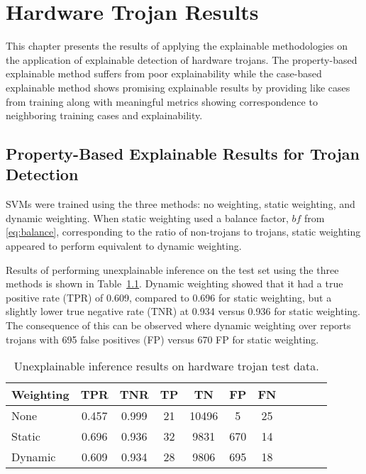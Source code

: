 \chapter{Hardware Trojan Results} \label{ch:trojan_results}

This chapter presents the results of applying the explainable methodologies on
the application of explainable detection of hardware trojans.  The
property-based explainable method suffers from poor explainability while the
case-based explainable method shows promising explainable results by providing
like cases from training along with meaningful metrics showing correspondence to
neighboring training cases and explainability.


\section{Property-Based Explainable Results for Trojan Detection} \label{prop_exp_results_trojan}

SVMs were trained using the three methods: no weighting, static weighting, and
dynamic weighting.  When static weighting used a balance factor, $bf$ from
\ref{eq:balance}, corresponding to the ratio of non-trojans to trojans, static
weighting appeared to perform equivalent to dynamic weighting.

Results of performing unexplainable inference on the test set using the three
methods is shown in Table~\ref{tab_unexp_weight_comp}. Dynamic weighting showed
that it had a true positive rate (TPR) of 0.609, compared to 0.696 for static
weighting, but a slightly lower true negative rate (TNR) at 0.934 versus 0.936
for static weighting. The consequence of this can be observed where dynamic
weighting over reports trojans with 695 false positives (FP) versus 670 FP for
static weighting.

\begin{table}[H]
    \renewcommand{\arraystretch}{1.3}
    \caption{Unexplainable inference results on hardware trojan test data.}
    \begin{center}
    \begin{tabular}{|l|c|c|c|c|c|c|c|c|c|c|}
        \hline
         Weighting &  TPR &  TNR &  TP &  TN &  FP &  FN \\
        \hline
        \hline
        None & 0.457 & 0.999 & 21 & 10496 & 5 & 25 \\
        \hline
        Static & 0.696 & 0.936 & 32 & 9831 & 670 & 14 \\
        \hline
        Dynamic & 0.609 & 0.934 & 28 & 9806 & 695 & 18 \\
        \hline
    \end{tabular}
    \end{center}
    \label{tab_unexp_weight_comp}
\end{table}

